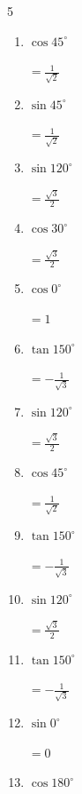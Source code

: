 \begin{multicols}{5}
\begin{enumerate}
        $\displaystyle =\frac{1}{\sqrt{2}}$

  \item $\displaystyle \cos{45^\circ}$

        $\displaystyle =\frac{1}{\sqrt{2}}$

\columnbreak %

  \item $\displaystyle \sin{45^\circ}$

        $\displaystyle =\frac{1}{\sqrt{2}}$

  \item $\displaystyle \sin{120^\circ}$

        $\displaystyle =\frac{\sqrt{3}}{2}$

  \item $\displaystyle \cos{30^\circ}$

        $\displaystyle =\frac{\sqrt{3}}{2}$

  \item $\displaystyle \cos{0^\circ}$

        $\displaystyle =1$

  \item $\displaystyle \tan{150^\circ}$

        $\displaystyle =-\frac{1}{\sqrt{3}}$

  \item $\displaystyle \sin{120^\circ}$

        $\displaystyle =\frac{\sqrt{3}}{2}$

  \item $\displaystyle \cos{45^\circ}$

        $\displaystyle =\frac{1}{\sqrt{2}}$

  \item $\displaystyle \tan{150^\circ}$

        $\displaystyle =-\frac{1}{\sqrt{3}}$

  \item $\displaystyle \sin{120^\circ}$

        $\displaystyle =\frac{\sqrt{3}}{2}$

  \item $\displaystyle \tan{150^\circ}$

        $\displaystyle =-\frac{1}{\sqrt{3}}$

  \item $\displaystyle \sin{0^\circ}$

        $\displaystyle =0$

  \item $\displaystyle \cos{180^\circ}$


\end{enumerate}
\end{multicols}
